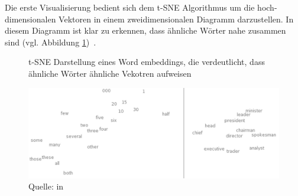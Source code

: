 Die erste Visualisierung bedient sich dem t-SNE Algorithmus um die hoch-dimensionalen Vektoren in einem zweidimensionalen Diagramm darzustellen. In diesem Diagramm ist klar zu erkennen, dass ähnliche Wörter nahe zusammen sind (vgl. Abbildung \ref{wordembeddingtsne})~\autocite{Olah2014b}.
\begin{figure}[h!]
    \centering
    \captionsetup{width=.9\linewidth}
    \caption[t-SNE Darstellung eines Word embeddings]{t-SNE Darstellung eines Word embeddings, die verdeutlicht, dass ähnliche Wörter ähnliche Vekotren aufweisen}
    \includegraphics[width=\textwidth]{graphics/wordmebeddingtsne.jpg}
    \caption*{Quelle: \textcite{Turian2010} in \textcite{Olah2014b}}
    \label{wordembeddingtsne}
\end{figure}

